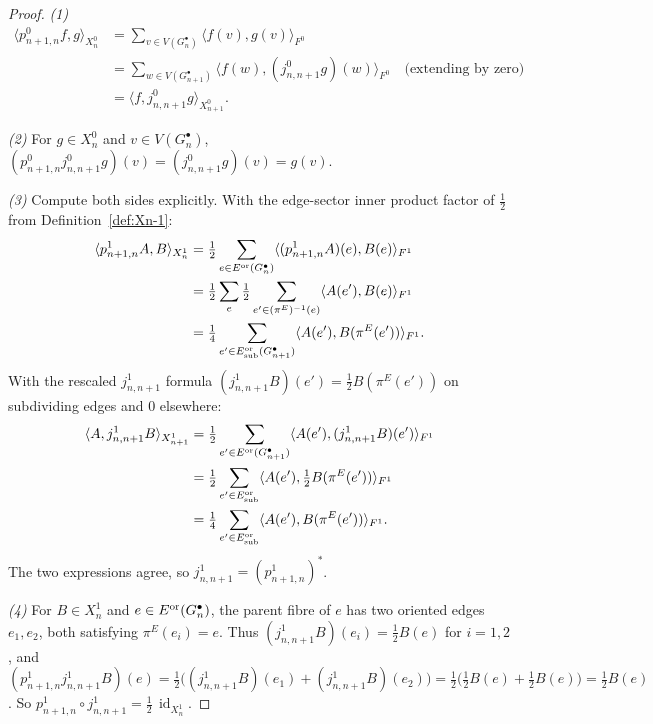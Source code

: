 \documentclass[11pt, a4paper]{amsart}
\theoremstyle{definition}
\newcommand{\id}{\operatorname{id}}
\begin{document}
\begin{proof}
\emph{(1)}
\begin{align*}
  \langle p_{n+1, n}^0 f, g \rangle_{X_n^0}
  &= \sum_{v \in V(G_n^\bullet)} \langle f(v), g(v) \rangle_{F^0} \\
  &= \sum_{w \in V(G_{n+1}^\bullet)} \langle f(w), (j_{n, n+1}^0 g)
    (w) \rangle_{F^0} \quad \text{(extending by zero)} \\
  &= \langle f, j_{n, n+1}^0 g \rangle_{X_{n+1}^0}.
\end{align*}

\emph{(2)} For $g \in X_n^0$ and $v \in V(G_n^\bullet)$,
$(p_{n+1, n}^0 j_{n, n+1}^0 g)(v) = (j_{n, n+1}^0 g)(v) = g(v)$.

\emph{(3)} Compute both sides explicitly. With the edge-sector
inner product factor of $\tfrac{1}{2}$ from
Definition~\ref{def:Xn-1}:
\begin{align*}
  \langle p_{n+1, n}^1 A, B \rangle_{X_n^1}
  &= \tfrac{1}{2} \sum_{e \in E^{\rm or}(G_n^\bullet)}
    \langle (p_{n+1, n}^1 A)(e), B(e) \rangle_{F^1} \\
  &= \tfrac{1}{2} \sum_{e} \tfrac{1}{2} \sum_{e' \in (\pi^E)^{-1}(e)}
    \langle A(e'), B(e) \rangle_{F^1} \\
  &= \tfrac{1}{4} \sum_{e' \in E^{\rm or}_{\rm sub}(G_{n+1}^
    \bullet)} \langle A(e'), B(\pi^E(e')) \rangle_{F^1}.
\end{align*}
With the rescaled $j_{n, n+1}^1$ formula
$(j_{n, n+1}^1 B)(e') = \tfrac{1}{2} B(\pi^E(e'))$ on subdividing
edges and $0$ elsewhere:
\begin{align*}
  \langle A, j_{n, n+1}^1 B \rangle_{X_{n+1}^1}
  &= \tfrac{1}{2} \sum_{e' \in E^{\rm or}(G_{n+1}^\bullet)}
    \langle A(e'), (j_{n, n+1}^1 B)(e') \rangle_{F^1} \\
  &= \tfrac{1}{2} \sum_{e' \in E^{\rm or}_{\rm sub}}
    \langle A(e'), \tfrac{1}{2} B(\pi^E(e')) \rangle_{F^1} \\
  &= \tfrac{1}{4} \sum_{e' \in E^{\rm or}_{\rm sub}}
    \langle A(e'), B(\pi^E(e')) \rangle_{F^1}.
\end{align*}
The two expressions agree, so $j_{n, n+1}^1 = (p_{n+1, n}^1)^*$.

\emph{(4)} For $B \in X_n^1$ and $e \in E^{\rm or}(G_n^\bullet)$,
the parent fibre of $e$ has two oriented edges $e_1, e_2$, both
satisfying $\pi^E(e_i) = e$. Thus
$(j_{n, n+1}^1 B)(e_i) = \tfrac{1}{2} B(e)$ for $i = 1, 2$, and
$(p_{n+1, n}^1 j_{n, n+1}^1 B)(e) = \tfrac{1}{2}\bigl((j_{n, n+1}^1
B)(e_1) + (j_{n, n+1}^1 B)(e_2)\bigr) = \tfrac{1}{2}\bigl(\tfrac{1}{2}
B(e) + \tfrac{1}{2} B(e)\bigr) = \tfrac{1}{2} B(e)$. So
$p_{n+1, n}^1 \circ j_{n, n+1}^1 = \tfrac{1}{2}\,\id_{X_n^1}$.
\end{proof}
\end{document}
